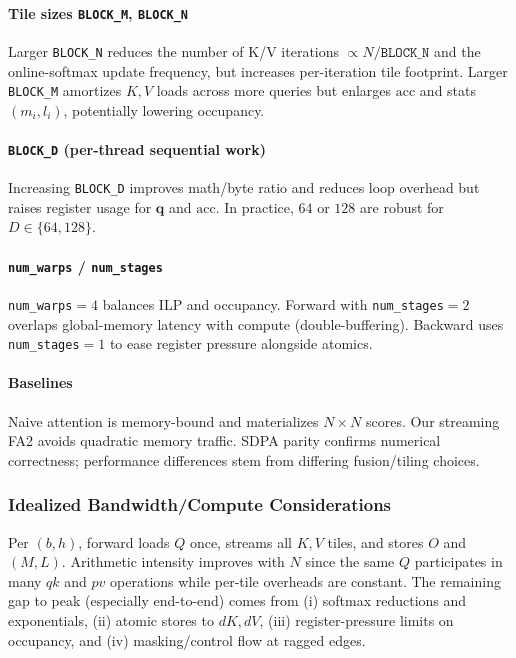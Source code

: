 \documentclass[11pt]{article}
\begin{document}
\paragraph{Tile sizes \texttt{BLOCK\_M}, \texttt{BLOCK\_N}}
Larger \texttt{BLOCK\_N} reduces the number of K/V iterations $\propto N/\texttt{BLOCK\_N}$ and the online-softmax update frequency, but increases per-iteration tile footprint. Larger \texttt{BLOCK\_M} amortizes $K,V$ loads across more queries but enlarges $\mathrm{acc}$ and stats $(m_i,l_i)$, potentially lowering occupancy.

\paragraph{\texttt{BLOCK\_D} (per-thread sequential work)}
Increasing \texttt{BLOCK\_D} improves math/byte ratio and reduces loop overhead but raises register usage for $\mathbf{q}$ and $\mathrm{acc}$. In practice, $64$ or $128$ are robust for $D\in\{64,128\}$.

\paragraph{\texttt{num\_warps} / \texttt{num\_stages}}
\texttt{num\_warps}$=4$ balances ILP and occupancy. Forward with \texttt{num\_stages}$=2$ overlaps global-memory latency with compute (double-buffering). Backward uses \texttt{num\_stages}$=1$ to ease register pressure alongside atomics.

\paragraph{Baselines}
Naive attention is memory-bound and materializes $N\times N$ scores. Our streaming FA2 avoids quadratic memory traffic. SDPA parity confirms numerical correctness; performance differences stem from differing fusion/tiling choices.

\subsubsection{Idealized Bandwidth/Compute Considerations}

Per $(b,h)$, forward loads $Q$ once, streams all $K,V$ tiles, and stores $O$ and $(M,L)$. Arithmetic intensity improves with $N$ since the same $Q$ participates in many $qk$ and $pv$ operations while per-tile overheads are constant. The remaining gap to peak (especially end-to-end) comes from (i) softmax reductions and exponentials, (ii) atomic stores to $dK,dV$, (iii) register-pressure limits on occupancy, and (iv) masking/control flow at ragged edges.


\end{document}
